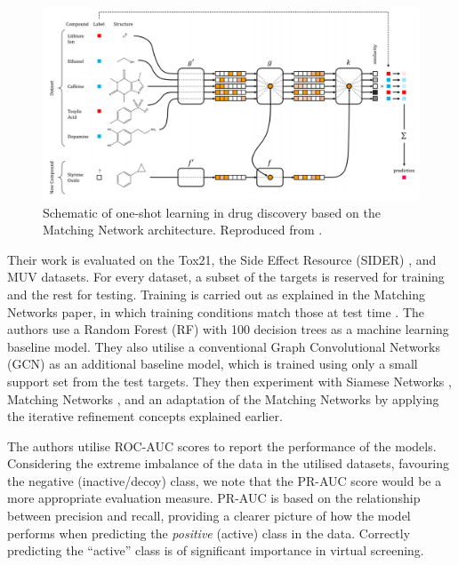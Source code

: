 \begin{figure}[h]
    \centering
    \includegraphics[width=0.9\linewidth]{img/pandeschematic.png}
    \caption[Schematic of one-shot learning in drug discovery]{Schematic of one-shot learning in drug discovery based on the Matching Network \citep{vinyals2016matching} architecture. Reproduced from \citet{altae2017low}.}
    \label{fig:schematiconeshotdrug}
\end{figure}

Their work is evaluated on the Tox21, the Side Effect Resource (SIDER) \citep{kuhn2016sider}, and MUV datasets\citep{rohrer2009maximum}. For every dataset, a subset of the targets is reserved for training and the rest for testing. Training is carried out as explained in the Matching Networks paper, in which training conditions match those at test time \citep{vinyals2016matching}. The authors use a Random Forest (RF) with 100 decision trees as a machine learning baseline model. They also utilise a conventional Graph Convolutional Networks (GCN) \citep{kipf2016semi} as an additional baseline model, which is trained using only a small support set from the test targets. They then experiment with Siamese Networks \citep{koch2015siamese}, Matching Networks \citep{vinyals2016matching}, and an adaptation of the Matching Networks by applying the iterative refinement concepts explained earlier.

The authors utilise ROC-AUC scores to report the performance of the models. Considering the extreme imbalance of the data in the utilised datasets, favouring the negative (inactive/decoy) class, we note that the PR-AUC score would be a more appropriate evaluation measure. PR-AUC is based on the relationship between precision and recall, providing a clearer picture of how the model performs when predicting the \textit{positive} (active) class in the data. Correctly predicting the ``active'' class is of significant importance in virtual screening.

